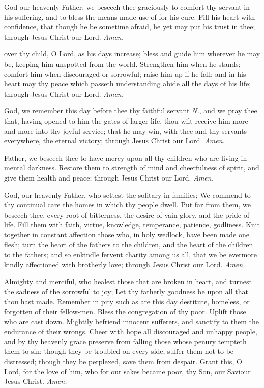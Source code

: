  God our heavenly Father, we beseech thee graciously to comfort thy servant in his suffering, and to bless the means made use of for his cure. Fill his heart with confidence, that though he be sometime afraid, he yet may put his trust in thee; through Jesus Christ our Lord. \textit{Amen.}

 over thy child, O Lord, as his days increase; bless and guide him wherever he may be, keeping him unspotted from the world. Strengthen him when he stands; comfort him when discouraged or sorrowful; raise him up if he fall; and in his heart may thy peace which passeth understanding abide all the days of his life; through Jesus Christ our Lord. \textit{Amen.}

 God, we remember this day before thee thy faithful servant \textit{N.}, and we pray thee that, having opened to him the gates of larger life, thou wilt receive him more and more into thy joyful service; that he may win, with thee and thy servants everywhere, the eternal victory; through Jesus Christ our Lord. \textit{Amen.}

 Father, we beseech thee to have mercy upon all thy children who are living in mental darkness. Restore them to strength of mind and cheerfulness of spirit, and give them health and peace; through Jesus Christ our Lord. \textit{Amen.}

 God, our heavenly Father, who settest the solitary in families; We commend to thy continual care the homes in which thy people dwell. Put far from them, we beseech thee, every root of bitterness, the desire of vain-glory, and the pride of life. Fill them with faith, virtue, knowledge, temperance, patience, godliness. Knit together in constant affection those who, in holy wedlock, have been made one flesh; turn the heart of the fathers to the children, and the heart of the children to the fathers; and so enkindle fervent charity among us all, that we be evermore kindly affectioned with brotherly love; through Jesus Christ our Lord. \textit{Amen.}

 Almighty and merciful, who healest those that are broken in heart, and turnest the sadness of the sorrowful to joy; Let thy fatherly goodness be upon all that thou hast made. Remember in pity such as are this day destitute, homeless, or forgotten of their fellow-men. Bless the congregation of thy poor. Uplift those who are cast down. Mightily befriend innocent sufferers, and sanctify to them the endurance of their wrongs. Cheer with hope all discouraged and unhappy people, and by thy heavenly grace preserve from falling those whose penury tempteth them to sin; though they be troubled on every side, suffer them not to be distressed; though they be perplexed, save them from despair. Grant this, O Lord, for the love of him, who for our sakes became poor, thy Son, our Saviour Jesus Christ. \textit{Amen.}

